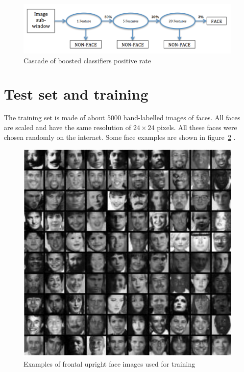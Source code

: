 \begin{figure}[!h]
\begin{center}
\noindent \includegraphics[scale=0.5]{figures/haar_feature_cascade_rate} 
\newline
\caption{Cascade of boosted classifiers positive rate}
\label{haar_feature_cascade_rate}
\end{center} 
\end{figure}

\section{Test set and training}

\vspace{\baselineskip}
\noindent The training set is made of about 5000 hand-labelled images of faces. All faces are scaled and have the same resolution of $ 24\times24 $ pixels. All these faces were chosen randomly on the internet. Some face examples are shown in figure~\ref{haar_feature_training_dataset} \cite{VIO01}.
\newline

\begin{figure}[!h]
\begin{center}
\noindent \includegraphics[scale=0.9]{figures/haar_feature_training_dataset} 
\newline
\caption{Examples of frontal upright face images used for training \cite{VIO01}}
\label{haar_feature_training_dataset}
\end{center} 
\end{figure}

